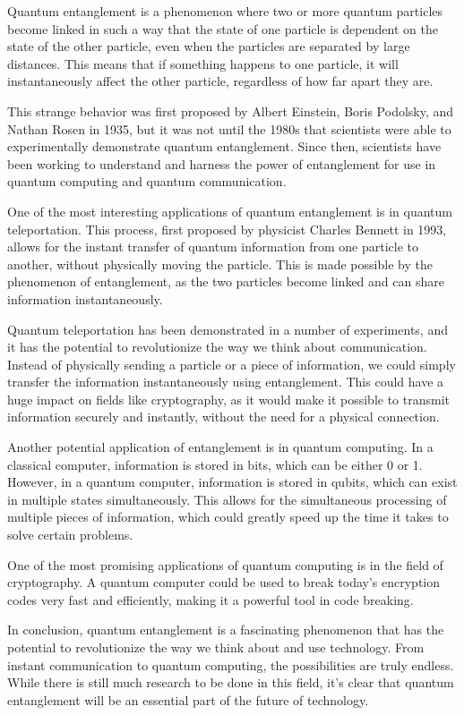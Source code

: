 Quantum entanglement is a phenomenon where two or more quantum particles become linked in such a way that the state of one particle is dependent on the state of the other particle, even when the particles are separated by large distances. This means that if something happens to one particle, it will instantaneously affect the other particle, regardless of how far apart they are.

This strange behavior was first proposed by Albert Einstein, Boris Podolsky, and Nathan Rosen in 1935, but it was not until the 1980s that scientists were able to experimentally demonstrate quantum entanglement. Since then, scientists have been working to understand and harness the power of entanglement for use in quantum computing and quantum communication.

One of the most interesting applications of quantum entanglement is in quantum teleportation. This process, first proposed by physicist Charles Bennett in 1993, allows for the instant transfer of quantum information from one particle to another, without physically moving the particle. This is made possible by the phenomenon of entanglement, as the two particles become linked and can share information instantaneously.

Quantum teleportation has been demonstrated in a number of experiments, and it has the potential to revolutionize the way we think about communication. Instead of physically sending a particle or a piece of information, we could simply transfer the information instantaneously using entanglement. This could have a huge impact on fields like cryptography, as it would make it possible to transmit information securely and instantly, without the need for a physical connection.

Another potential application of entanglement is in quantum computing. In a classical computer, information is stored in bits, which can be either 0 or 1. However, in a quantum computer, information is stored in qubits, which can exist in multiple states simultaneously. This allows for the simultaneous processing of multiple pieces of information, which could greatly speed up the time it takes to solve certain problems.

One of the most promising applications of quantum computing is in the field of cryptography. A quantum computer could be used to break today's encryption codes very fast and efficiently, making it a powerful tool in code breaking.

In conclusion, quantum entanglement is a fascinating phenomenon that has the potential to revolutionize the way we think about and use technology. From instant communication to quantum computing, the possibilities are truly endless. While there is still much research to be done in this field, it's clear that quantum entanglement will be an essential part of the future of technology.
